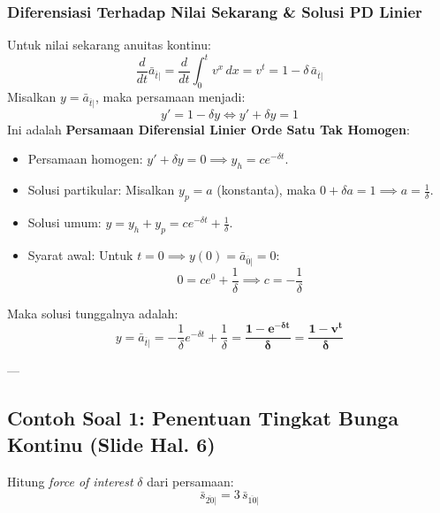 \documentclass[11pt,a4paper]{article}
\begin{document}
\subsubsection{Diferensiasi Terhadap Nilai Sekarang \& Solusi PD Linier}
Untuk nilai sekarang anuitas kontinu:
\begin{equation}
    \frac{d}{dt} \bar{a}_{\overline{t}|} = \frac{d}{dt} \int_0^t v^x \, dx = v^t = 1 - \delta \, \bar{a}_{\overline{t}|}
\end{equation}
Misalkan $y = \bar{a}_{\overline{t}|}$, maka persamaan menjadi:
\begin{equation}
    y' = 1 - \delta y \iff y' + \delta y = 1
\end{equation}
Ini adalah \textbf{Persamaan Diferensial Linier Orde Satu Tak Homogen}:
\begin{itemize}
    \item Persamaan homogen: $y' + \delta y = 0 \implies y_h = c e^{-\delta t}$.
    \item Solusi partikular: Misalkan $y_p = a$ (konstanta), maka $0 + \delta a = 1 \implies a = \frac{1}{\delta}$.
    \item Solusi umum: $y = y_h + y_p = c e^{-\delta t} + \frac{1}{\delta}$.
    \item Syarat awal: Untuk $t = 0 \implies y(0) = \bar{a}_{\overline{0}|} = 0$:
    \begin{equation*}
        0 = c e^0 + \frac{1}{\delta} \implies c = -\frac{1}{\delta}
    \end{equation*}
\end{itemize}
Maka solusi tunggalnya adalah:
\begin{equation}
    y = \bar{a}_{\overline{t}|} = -\frac{1}{\delta} e^{-\delta t} + \frac{1}{\delta} = \mathbf{\frac{1 - e^{-\delta t}}{\delta} = \frac{1 - v^t}{\delta}}
\end{equation}

---

\subsection{Contoh Soal 1: Penentuan Tingkat Bunga Kontinu (Slide Hal. 6)}

\begin{examplebox}
Hitung \textit{force of interest} $\delta$ dari persamaan:
\begin{equation*}
    \bar{s}_{\overline{20}|} = 3 \, \bar{s}_{\overline{10}|}
\end{equation*}
\end{examplebox}
\end{document}

